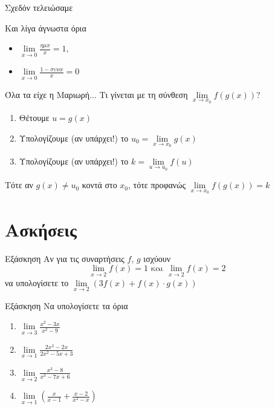 \documentclass[greek]{beamer}
\begin{document}
\begin{frame}{Σχεδόν τελειώσαμε}
 \begin{block}{Και λίγα άγνωστα όρια}
  \begin{itemize}
   \item $\lim\limits_{x \to 0}{ \frac{ημx}{x} }=1$, \pause
   \item $\lim\limits_{x \to 0}{ \frac{1-συνx}{x} }=0$
  \end{itemize}
 \end{block}
\end{frame}

\begin{frame}{Όλα τα είχε η Μαριωρή...}
 Τι γίνεται με τη σύνθεση  $\lim\limits_{x \to x_0}{ f(g(x))}$? \pause
 \begin{enumerate}
  \item Θέτουμε $u=g(x)$ \pause
  \item Υπολογίζουμε (αν υπάρχει!) το $u_0=\lim\limits_{x \to x_0}{ g(x)}$ \pause
  \item Υπολογίζουμε (αν υπάρχει!) το $k=\lim\limits_{u \to u_0}{ f(u)}$ \pause
 \end{enumerate}
 Τότε αν $g(x)\ne u_0$ κοντά στο $x_0$, τότε προφανώς $\lim\limits_{x \to x_0}{ f(g(x))}=k$
\end{frame}

\section{Ασκήσεις}
\begin{frame}{Εξάσκηση}
 Αν για τις συναρτήσεις $f$, $g$ ισχύουν
 $$\lim\limits_{x \to 2}{ f(x) }=1 \text{ και } \lim\limits_{ x \to 2}{ f(x) }=2$$
 να υπολογίσετε το $\lim\limits_{x \to 2}{ (3f(x)+f(x)\cdot g(x)) }$
\end{frame}

\begin{frame}{Εξάσκηση}
 Να υπολογίσετε τα όρια
 \begin{enumerate}
  \item $\lim\limits_{x \to 3}{ \frac{x^2-3x}{x^2-9} }$ \pause
  \item $\lim\limits_{x \to 1}{ \frac{2x^3-2x}{2x^2-5x+3} }$ \pause
  \item $\lim\limits_{x \to 2}{ \frac{x^3-8}{x^3-7x+6} }$ \pause
  \item $\lim\limits_{x \to 1}{ \left( \frac{x}{x-1}+\frac{x-2}{x^2-x}  \right)  }$
 \end{enumerate}
\end{frame}
\end{document}
